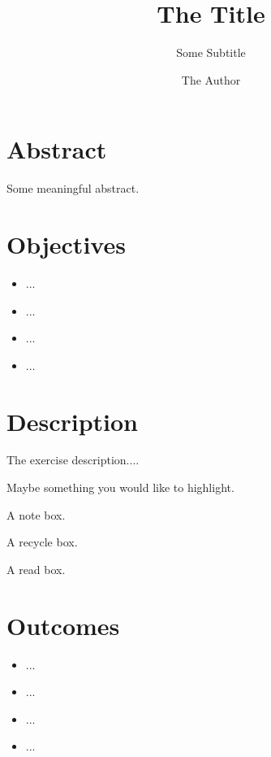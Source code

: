 \documentclass[
	invert-title=true,
	titlepage=false,
	titleimage-ratio=13
]{bfhpub}				%
\begin{document}
\title{The Title}
\subtitle{Some Subtitle}
\author{The Author}
\subject{Subject}
  
\maketitle

\section*{Abstract}
Some meaningful abstract.

\section*{Objectives}
\begin{multicols}{2}
\begin{itemize}
\item ...
\item ...
\item ...
\item ...
\end{itemize}
\end{multicols}

\section*{Description}
The exercise description....

Maybe something you would like to highlight.

\begin{bfhNoteBox}
  A note box.
\end{bfhNoteBox}

\begin{bfhRecycleBox}
  A recycle box.
\end{bfhRecycleBox}

\begin{bfhReadBox}
  A read box.
\end{bfhReadBox}

\section*{Outcomes}
\begin{multicols}{2}
\begin{itemize}
\item ...
\item ...
\item ...
\item ...
\end{itemize}
\end{multicols}
\end{document}

